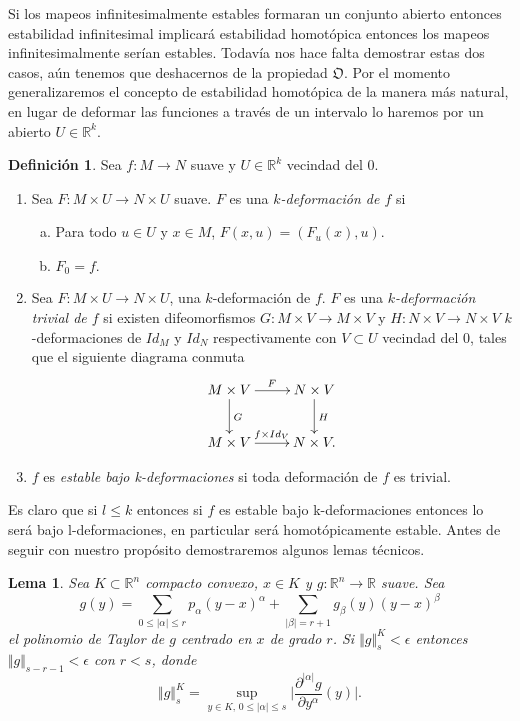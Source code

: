 \documentclass{report}
\newtheorem{lem}[theorem]{Lema}
\theoremstyle{definition}
\newtheorem{defi}[theorem]{Definici\'on}
\begin{document}
Si los mapeos infinitesimalmente estables formaran un conjunto abierto entonces estabilidad infinitesimal implicar\'a estabilidad homot\'opica entonces los mapeos infinitesimalmente ser\'ian estables. Todav\'ia nos hace falta demostrar estas dos casos, a\'un tenemos que deshacernos de la propiedad $\mathfrak{O}$. Por el momento generalizaremos el concepto de estabilidad homot\'opica de la manera m\'as natural, en lugar de deformar las funciones a trav\'es de un intervalo lo haremos por un abierto $U \in \mathbb{R}^k$.

\begin{defi}
Sea $f:M \to N$ suave y $U \in \mathbb{R}^k$ vecindad del $0$.
\begin{enumerate}
\item Sea $F:M \times U \to N \times U$ suave. $F$ es una \textit{$k$-deformaci\'on de $f$} si 
\begin{enumerate}[a.]
\item Para todo $u \in U$ y $x \in M$, $F(x,u) = (F_u (x), u)$.
\item $F_0 = f.$

\end{enumerate}
\item Sea $F: M\times U \to N \times U$, una $k$-deformaci\'on de $f$. $F$ es una \textit{$k$-deformaci\'on trivial de $f$} si existen difeomorfismos $G: M \times V \to M \times V$ y $H: N \times V \to N \times V$ $k$-deformaciones de $Id_M$ y $Id_N$ respectivamente con $V \subset U$ vecindad del $0$, tales que el siguiente diagrama conmuta
$$\xymatrix{
M \times V \ar[d]^G \ar[r]^F &N \times V\ar[d]^H\\
M \times V \ar[r]^{f \times Id_V} &N \times V.}$$
\item $f$ es \textit{estable bajo k-deformaciones} si toda deformaci\'on de $f$ es trivial.
\end{enumerate}
\end{defi}

Es claro que si $l \leq k$ entonces si $f$ es estable bajo k-deformaciones entonces lo ser\'a bajo l-deformaciones, en particular ser\'a homot\'opicamente estable. Antes de seguir con nuestro prop\'osito demostraremos algunos lemas t\'ecnicos.

\begin{lem}
Sea $K \subset \mathbb{R}^n$ compacto convexo, $x \in K$ y $g: \mathbb{R}^n \to \mathbb{R}$ suave. Sea $$g(y) = \sum\limits_{0 \leq \vert \alpha \vert \leq r} p_\alpha (y - x)^\alpha + \sum\limits_{\vert \beta \vert = r+1} g_\beta(y)(y-x)^\beta$$
el polinomio de Taylor de $g$ centrado en $x$ de grado $r$. Si $\Vert g \Vert_s^K < \epsilon $ entonces $\Vert g \Vert_{s-r-1} < \epsilon$ con $r < s$, donde $$\Vert g \Vert_s^K = \sup\limits_{ y \in K, \, 0 \leq  \vert \alpha \vert \leq s } \vert \frac{\partial^{\vert \alpha \vert} g}{\partial y^\alpha} (y) \vert.$$
\end{lem}
\end{document}
